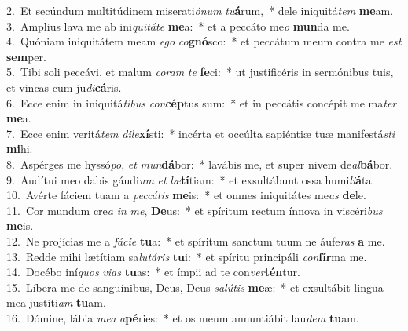 {2.~}Et secúndum multitúdinem miserati\textit{ó}\textit{num} \textit{tu}\textbf{á}rum,~* dele iniquitá\textit{tem} \textbf{me}am.\\
{3.~}Amplius lava me ab ini\textit{qui}\textit{tá}\textit{te} \textbf{me}a:~* et a peccáto me\textit{o} \textbf{mun}da me.\\
{4.~}Quóniam iniquitátem meam \textit{e}\textit{go} \textit{co}\textbf{gnó}sco:~* et peccátum meum contra me \textit{est} \textbf{sem}per.\\
{5.~}Tibi soli peccávi, et malum \textit{co}\textit{ram} \textit{te} \textbf{fe}ci:~* ut justificéris in sermónibus tuis, et vincas cum ju\textit{di}\textbf{cá}ris.\\
{6.~}Ecce enim in iniquitá\textit{ti}\textit{bus} \textit{con}\textbf{cép}tus sum:~* et in peccátis concépit me ma\textit{ter} \textbf{me}a.\\
{7.~}Ecce enim veritá\textit{tem} \textit{di}\textit{le}\textbf{xí}sti:~* incérta et occúlta sapiéntiæ tuæ manifestá\textit{sti} \textbf{mi}hi.\\
{8.~}Aspérges me hyssó\textit{po}, \textit{et} \textit{mun}\textbf{dá}bor:~* lavábis me, et super nivem de\textit{al}\textbf{bá}bor.\\
{9.~}Audítui meo dabis gáudi\textit{um} \textit{et} \textit{læ}\textbf{tí}tiam:~* et exsultábunt ossa humi\textit{li}\textbf{á}ta.\\
{10.~}Avérte fáciem tuam a \textit{pec}\textit{cá}\textit{tis} \textbf{me}is:~* et omnes iniquitátes me\textit{as} \textbf{de}le.\\
{11.~}Cor mundum cre\textit{a} \textit{in} \textit{me}, \textbf{De}us:~* et spíritum rectum ínnova in viscéri\textit{bus} \textbf{me}is.\\
{12.~}Ne projícias me a \textit{fá}\textit{ci}\textit{e} \textbf{tu}a:~* et spíritum sanctum tuum ne áufe\textit{ras} \textbf{a} me.\\
{13.~}Redde mihi lætítiam sa\textit{lu}\textit{tá}\textit{ris} \textbf{tu}i:~* et spíritu principáli \textit{con}\textbf{fír}ma me.\\
{14.~}Docébo iní\textit{quos} \textit{vi}\textit{as} \textbf{tu}as:~* et ímpii ad te con\textit{ver}\textbf{tén}tur.\\
{15.~}Líbera me de sanguínibus, Deus, Deus \textit{sa}\textit{lú}\textit{tis} \textbf{me}æ:~* et exsultábit lingua mea justíti\textit{am} \textbf{tu}am.\\
{16.~}Dómine, lábia \textit{me}\textit{a} \textit{a}\textbf{pé}ries:~* et os meum annuntiábit lau\textit{dem} \textbf{tu}am.\\
